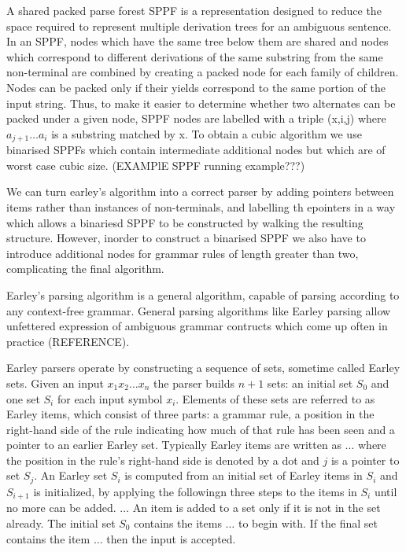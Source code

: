 \begin{isabellebody}
\begin{isamarkuptext}
A shared packed parse forest SPPF is a representation designed to reduce the space required to represent multiple derivation
trees for an ambiguous sentence. In an SPPF, nodes which have the same tree below them are shared and nodes which correspond
to different derivations of the same substring from the same non-terminal are combined by creating a packed node for each
family of children. Nodes can be packed only if their yields correspond to the same portion of the input string. Thus, to make it easier
to determine whether two alternates can be packed under a given node, SPPF nodes are labelled with a triple (x,i,j) where
$a_{j+1} \dots a_i$ is a substring matched by x. To obtain a cubic algorithm we use binarised SPPFs which contain intermediate additional
nodes but which are of worst case cubic size. (EXAMPlE SPPF running example???)

We can turn earley's algorithm into a correct parser by adding pointers between items rather than instances of non-terminals, and labelling th epointers
in a way which allows a binariesd SPPF to be constructed by walking the resulting structure. However, inorder to
construct a binarised SPPF we also have to introduce additional nodes for grammar rules of length greater than two,
complicating the final algorithm.%
\end{isamarkuptext}\isamarkuptrue%
%
\isadelimdocument
%
\endisadelimdocument
%
\isatagdocument
%
\isamarkuptrue%
%
\endisatagdocument
{\isafolddocument}%
%
\isadelimdocument
%
\endisadelimdocument
%
\begin{isamarkuptext}%
Earley's parsing algorithm is a general algorithm, capable of parsing according to any context-free
grammar. General parsing algorithms like Earley parsing allow unfettered expression of ambiguous grammar
contructs which come up often in practice (REFERENCE).

Earley parsers operate by constructing a sequence of sets, sometime called Earley sets. Given an input
$x_1 x_2 \dots x_n$ the parser builds $n+1$ sets: an initial set $S_0$ and one set $S_i$ for each input
symbol $x_i$. Elements of these sets are referred to as Earley items, which consist of three parts:
a grammar rule, a position in the right-hand side of the rule indicating how much of that rule has been
seen and a pointer to an earlier Earley set. Typically Earley items are written as $\dots$ where the position
in the rule's right-hand side is denoted by a dot and $j$ is a pointer to set $S_j$.
An Earley set $S_i$ is computed from an initial set of Earley items in $S_i$ and $S_{i+1}$ is initialized, by
applying the followingn three steps to the items in $S_i$ until no more can be added. $\dots$
An item is added to a set only if it is not in the set already. The initial set $S_0$ contains the items $\dots$
to begin with. If the final set contains the item $\dots$ then the input is accepted.


\end{isamarkuptext}
\end{isabellebody}
